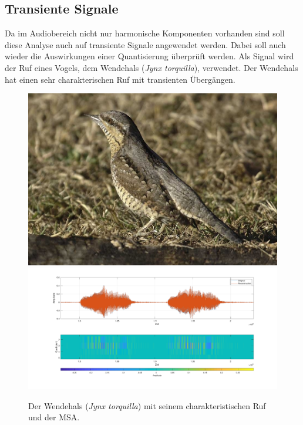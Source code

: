 \begin{refsection}
\subsection{Transiente Signale}
Da im Audiobereich nicht nur harmonische Komponenten vorhanden sind soll diese Analyse auch auf transiente Signale angewendet werden.
Dabei soll auch wieder die Auswirkungen einer Quantisierung überprüft werden.
Als Signal wird der Ruf eines Vogels, dem Wendehals (\textit{Jynx torquilla}), verwendet.
Der Wendehals hat einen sehr charakterischen Ruf mit transienten Übergängen.
\begin{figure}
	\includegraphics[width=0.4\linewidth]{papers/compress/Bilder/wendehals.jpg}
	\includegraphics[width=0.6\linewidth]{papers/compress/Bilder/jynxAll.pdf}
	\caption{Der Wendehals (\textit{Jynx torquilla}) \cite{wikipedia:wendehals} mit seinem charakteristischen Ruf und der MSA.}
	\label{fig:jynxAll}
\end{figure}


\end{refsection}
